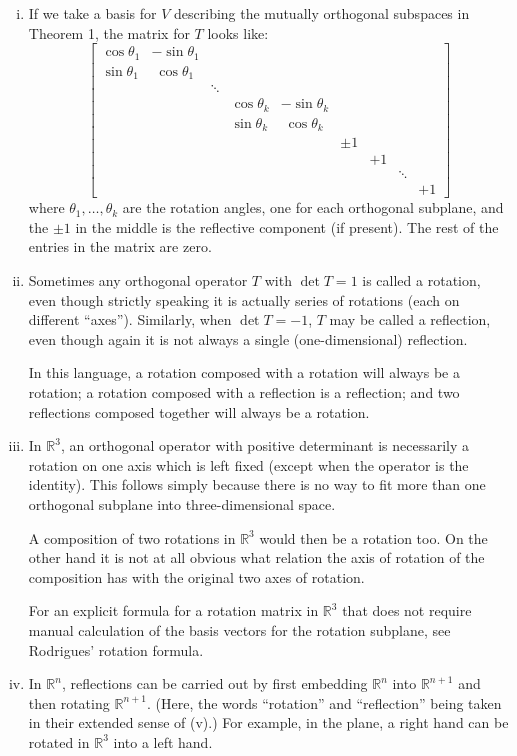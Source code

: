 \documentclass[12pt]{article}
\newcommand{\real}{\mathbb{R}}
\begin{document}
\begin{enumerate}[i.]
\item
If we take a basis for $V$ describing the mutually orthogonal subspaces in Theorem 1,
the matrix for $T$ looks like:
\[
\begin{bmatrix}
\cos \theta_1 & -\sin \theta_1 \\
\sin \theta_1 & \; \cos \theta_1 \\
& & \ddots \\
& & & \cos \theta_k & -\sin \theta_k \\
& & & \sin \theta_k & \; \cos \theta_k \\
& & & & & \pm 1 \\
& & & & & & +1 \\
& & & & & & & \ddots \\
& & & & & & & & +1
\end{bmatrix}
\]
where $\theta_1, \dotsc, \theta_k$ are the rotation angles, one for each orthogonal subplane,
and the $\pm 1$ in the middle is the reflective component (if present).  The rest of the entries
in the matrix are zero.

\item
Sometimes any orthogonal operator $T$ with $\det T = 1$
is called a rotation, even though strictly speaking it is actually series of rotations
(each on different ``axes'').  Similarly, when $\det T = -1$,
$T$ may be called a reflection, even though again it is not always a single (one-dimensional)
reflection.

In this language, a rotation composed with a rotation will always be a rotation;
a rotation composed with a reflection is a reflection; and two reflections composed together will always be a rotation.

\item
In $\real^3$, an orthogonal operator with positive determinant is necessarily
a rotation on one axis which is left fixed (except when the operator is the identity).
This follows simply because there is no way to fit more than one orthogonal subplane
into three-dimensional space.

A composition of two rotations in $\real^3$ would then
be a rotation too.
On the other hand it is not at all obvious what relation the axis of rotation
of the composition has with the original two axes of rotation.

For an explicit formula for a rotation matrix in $\real^3$ that does not
require manual calculation of the basis vectors for the rotation subplane, see Rodrigues' rotation formula.

\item
In $\real^n$, reflections can be carried out by first embedding $\real^n$ into $\real^{n+1}$
and then rotating $\real^{n+1}$.  
(Here, the words ``rotation'' and ``reflection'' being taken in their extended sense of (v).)
For example, in the plane, a right hand can be
rotated in $\real^3$ into a left hand. 


\end{enumerate}
\end{document}
